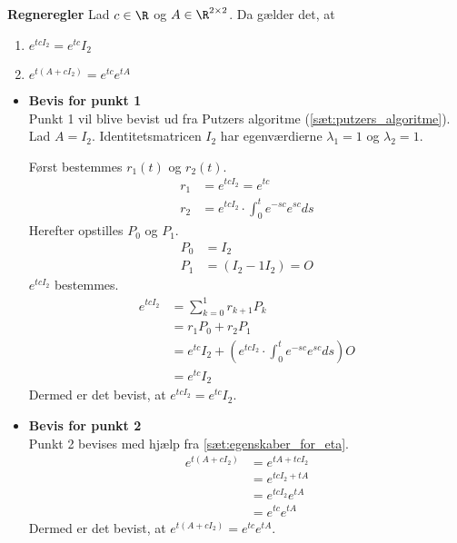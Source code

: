\begin{thmx}\textbf{Regneregler} \label{sæt:regneregler_for_etcI}
\newline
Lad $c\in\R$ og $A\in\R^{2\times2}$. Da gælder det, at
\begin{enumerate}
    \item $e^{tcI_2} = e^{tc}I_2$
    \item $e^{t(A+cI_2)} = e^{tc}e^{tA}$
\end{enumerate}
\end{thmx}
%
\begin{bev}\textbf{}
\begin{itemize}
\item [] \textbf{Bevis for punkt 1}\\
Punkt 1 vil blive bevist ud fra Putzers algoritme (\autoref{sæt:putzers_algoritme}). Lad $A=I_2$. Identitetsmatricen $I_2$ har egenværdierne $\lambda_1=1 $ og $\lambda_2=1$.

Først bestemmes $r_1(t)$ og $r_2(t)$. 
%
\begin{align*}
    r_1 &= e^{tcI_2} = e^{tc} \\
    r_2 &= e^{tcI_2}\cdot \int_0^te^{-sc}e^{sc} ds
\end{align*}
%
Herefter opstilles $P_0$ og $P_1$.
\begin{align*}
    P_0 &= I_2\\
    P_1 &= (I_2 - 1I_2) = O
\end{align*}
%
$e^{tcI_2}$ bestemmes. 
%
\begin{align*}
    e^{tcI_2} &= \sum_{k=0}^1 r_{k+1}P_k \\
    &= r_1P_0 + r_2P_1\\
    &= e^{tc}I_2 + \left(e^{tcI_2}\cdot \int_0^te^{-sc}e^{sc}ds\right) O \\
    &= e^{tc}I_2
\end{align*}
Dermed er det bevist, at $e^{tcI_2} = e^{tc}I_2$.

\item [] \textbf{Bevis for punkt 2}\\
Punkt 2 bevises med hjælp fra \autoref{sæt:egenskaber_for_eta}.
\begin{align*}
    e^{t(A+cI_2)} &= e^{tA+tcI_2} \\ 
    &= e^{tcI_2+tA}\\ 
    &=e^{tcI_2}e^{tA} \\
    &= e^{tc}e^{tA}
\end{align*}
%
Dermed er det bevist, at $e^{t(A+cI_2)}=e^{tc}e^{tA}$.
%
\end{itemize}
\end{bev}